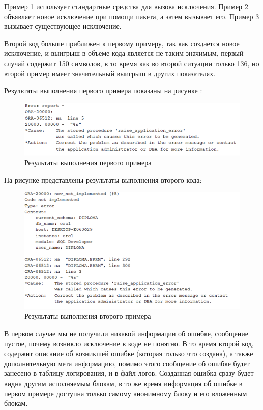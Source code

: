 Пример 1 использует стандартные средства для вызова исключения. Пример 2 объявляет новое исключение при помощи пакета, а затем вызывает его. Пример 3 вызывает существующее исключение. 

Второй код больше приближен к первому примеру, так как создается новое исключение, и выигрыш в объеме кода является не таким значимым, первый случай содержит 150 символов, в то время как во второй ситуации только 136, но второй пример имеет значительный выигрыш в других показателях. 

Результаты выполнения первого примера показаны на рисунке :

\begin{figure}[ht!] 
	\center
	\includegraphics [scale=1] {my_folder/img/c4_1_example_res.png}
	\caption{Результаты выполнения первого примера} 
	\label{fig:c4_1_example_res}  
\end{figure}
\FloatBarrier

На рисунке  представлены результаты выполнения второго кода:

\begin{figure}[ht!] 
	\center
	\includegraphics [scale=1] {my_folder/img/c4_2_example_res.png}
	\caption{Результаты выполнения второго примера} 
	\label{fig:c4_2_example_res}  
\end{figure}
\FloatBarrier

В первом случае мы не получили никакой информации об ошибке, сообщение пустое, почему возникло исключение в коде не понятно. В то время второй код, содержит описание об возникшей ошибке (которая только что создана), а также дополнительную мета информацию, помимо этого сообщение об ошибке будет занесено в таблицу логирования, и в файл логов. Созданная ошибка сразу будет видна другим исполняемым блокам, в то же время информация об ошибке в первом примере доступна только самому анонимному блоку и его вложенным блокам. 

